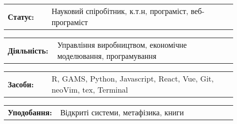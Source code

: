 \documentclass[10pt,A4]{article}
\newcommand{\tzlarrow}{(0,0) -- (0.2,0) -- (0.3,0.2) -- (0.2,0.4) -- (0,0.4) -- (0.1,0.2) -- cycle;}
\newcommand{\larrow}[1]
{\begin{tikzpicture}[scale=0.58]
	 \filldraw[fill=#1!100,draw=#1!100!black]  \tzlarrow
 \end{tikzpicture}
}
\newcommand{\metasection}[2]{
	\begin{tabular*}{1\linewidth}{p{0.18\linewidth} p{0.76\linewidth}}
		\larrow{bgcol}\normalsize{\textbf{\textcolor{sectcol}{#1}}}&#2\\
	\end{tabular*}
}
\newcommand{\spread}{7pt}
\begin{document}
\begin{minipage}[t]{0.485\textwidth}

\vspace{\spread}

\metasection{Статус:}{Науковий спіробітник, к.т.н, програміст, веб-програміст}
\metasection{Діяльність:}{Управління виробництвом, економічне моделювання, програмування} 
\end{minipage}
\hfill
\begin{minipage}[t]{0.485\textwidth}

\vspace{5pt}

\metasection{Засоби:}{R, GAMS, Python, Javascript, React, Vue, Git, neoVim, tex, Terminal}
\metasection{Уподобання:}{Відкриті системи, метафізика, книги}
\end{minipage}
\end{document}
